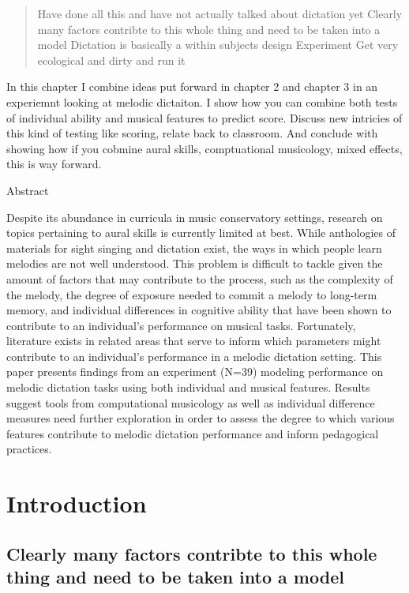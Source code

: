 \documentclass[]{book}
\begin{document}
\begin{quote}
Have done all this and have not actually talked about dictation yet
Clearly many factors contribte to this whole thing and need to be taken into a model
Dictation is basically a within subjects design Experiment
Get very ecological and dirty and run it
\end{quote}

In this chapter I combine ideas put forward in chapter 2 and chapter 3 in an experiemnt looking at melodic dictaiton.
I show how you can combine both tests of individual ability and musical features to predict score.
Discuss new intricies of this kind of testing like scoring, relate back to classroom.
And conclude with showing how if you cobmine aural skills, comptuational musicology, mixed effects, this is way forward.

Abstract

Despite its abundance in curricula in music conservatory settings,
research on topics pertaining to aural skills is currently limited at
best. While anthologies of materials for sight singing and dictation
exist, the ways in which people learn melodies are not well
understood. This problem is difficult to tackle given the amount of
factors that may contribute to the process, such as the complexity of
the melody, the degree of exposure needed to commit a melody to
long-term memory, and individual differences in cognitive ability
that have been shown to contribute to an individual's performance on
musical tasks. Fortunately, literature exists in related areas that serve
to inform which parameters might contribute to an individual's
performance in a melodic dictation setting. This paper presents
findings from an experiment (N=39) modeling performance on
melodic dictation tasks using both individual and musical features.
Results suggest tools from computational musicology as well as
individual difference measures need further exploration in order to
assess the degree to which various features contribute to melodic
dictation performance and inform pedagogical practices.

\hypertarget{introduction}{%
\section{Introduction}\label{introduction}}

\hypertarget{clearly-many-factors-contribte-to-this-whole-thing-and-need-to-be-taken-into-a-model}{%
\subsection{Clearly many factors contribte to this whole thing and need to be taken into a model}\label{clearly-many-factors-contribte-to-this-whole-thing-and-need-to-be-taken-into-a-model}}
\end{document}
